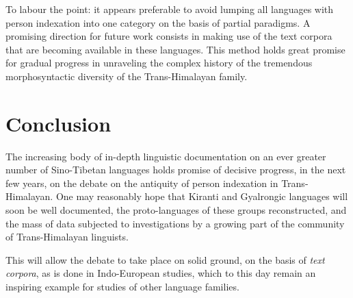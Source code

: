 \documentclass[oldfontcommands,oneside,a4paper,11pt]{article}
\begin{document}
To labour the point: it appears preferable to avoid lumping all languages with person indexation into one category on the basis of partial paradigms. A promising direction for future work consists in making use of the text corpora that are becoming available in these languages. This method holds great promise for gradual progress in unraveling the complex history of  the tremendous morphosyntactic diversity of the Trans-Himalayan family.

\section{Conclusion}

The increasing body of in-depth linguistic documentation on an ever greater number of Sino-Tibetan languages holds promise of decisive progress, in the next few years, on the debate on the antiquity of person indexation in Trans-Himalayan. One may reasonably hope that Kiranti and Gyalrongic languages will soon be well documented, the proto-languages of these groups reconstructed, and the mass of data subjected to investigations by a growing part of  the community of Trans-Himalayan linguists.

This will allow the debate to take place on solid ground,  on the basis of \textit{text corpora}, as is done in Indo-European studies, which to this day remain an inspiring example for studies of other language families.

\charis


\end{document}
